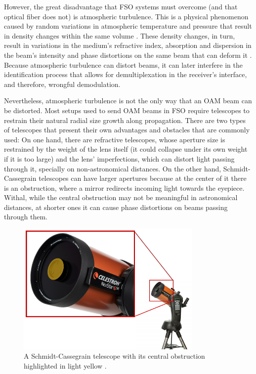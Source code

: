 However, the great disadvantage that FSO systems must overcome (and that optical fiber does not) is atmospheric turbulence. This is a physical phenomenon caused by random variations in atmospheric temperature and pressure that result in density changes within the same volume \cite{Field_Guide_to_Atmospheric_Optics}. These density changes, in turn, result in variations in the medium's refractive index, absorption and dispersion in the beam's intensity and phase distortions on the same beam that can deform it \cite{Rodenburg:12}. Because atmospheric turbulence can distort beams, it can later interfere in the identification process that allows for demultiplexation in the receiver's interface, and therefore, wrongful demodulation.

Nevertheless, atmospheric turbulence is not the only way that an OAM beam can be distorted. Most setups used to send OAM beams in FSO require telescopes to restrain their natural radial size growth along propagation. There are two types of telescopes that present their own advantages and obstacles that are commonly used: On one hand, there are refractive telescopes, whose aperture size is restrained by the weight of the lens itself (it could collapse under its own weight if it is too large) and the lens' imperfections, which can distort light passing through it, specially on non-astronomical distances. On the other hand, Schmidt-Cassegrain telescopes can have larger apertures because at the center of it there is an obstruction, where a mirror redirects incoming light towards the eyepiece. Withal, while the central obstruction may not be meaningful in astronomical distances, at shorter ones it can cause phase distortions on beams passing through them.

\begin{figure}[htbp]
    \centering
    \includegraphics[width=9cm]{images/c03/Cassegrain-Obstruction.png}
    \caption{A Schmidt-Cassegrain telescope with its central obstruction highlighted in light yellow \cite{Schmidt-Cassegrain_Pics}.}
    \label{fig:intro-schmidt-cassegrain}
\end{figure}

